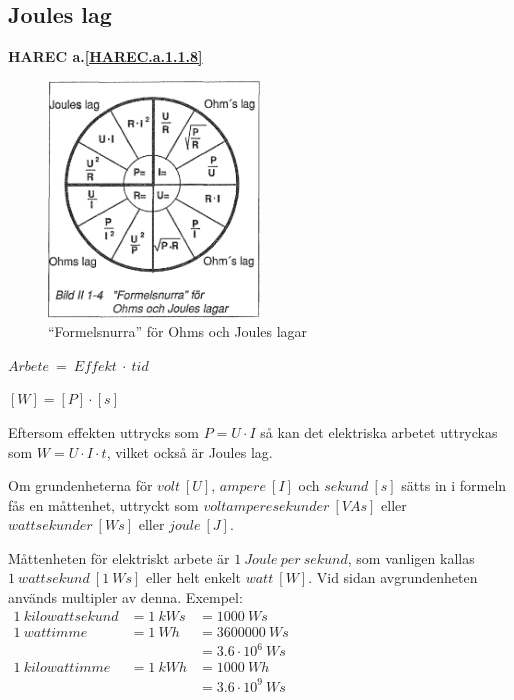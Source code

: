 \subsection{Joules lag}
\textbf{HAREC a.\ref{HAREC.a.1.1.8}\label{myHAREC.a.1.1.8}}

\begin{figure}
  \includegraphics[width=0.5\textwidth]{images/bild_2_1-04}
  \caption{``Formelsnurra'' för Ohms och Joules lagar}
  \label{fig:BildII1-4}
\end{figure}

\(Arbete\ =\ Effekt\ \cdot\ tid\)

\([W] = [P] \cdot [s]\)

Eftersom effekten uttrycks som \(P = U \cdot I\) så kan det elektriska arbetet
uttryckas som \(W = U \cdot I \cdot t\), vilket också är Joules lag.

Om grundenheterna för \(volt\ [U]\), \(ampere\ [I]\) och \(sekund\ [s]\) sätts in i
formeln fås en måttenhet, uttryckt som \(voltamperesekunder\ [VAs]\) eller
\(wattsekunder\ [Ws]\) eller \(joule\ [J]\).

Måttenheten för elektriskt arbete är \(1\ Joule\ per\ sekund\), som vanligen kallas
\(1\ wattsekund\ [1\ Ws]\) eller helt enkelt \(watt\ [W]\).
Vid sidan avgrundenheten används multipler
av denna.
Exempel:
\(
\begin{array}{lll}
1\ kilowattsekund & = 1\ kWs & = 1 000\ Ws \\
1\ wattimme & = 1\ Wh & = 3600000\ Ws \\
 & & = 3.6 · 10^6\ Ws \\
1\ kilowattimme & = 1\ kWh & = 1 000\ Wh \\
 & & = 3.6 · 10^9\ Ws
\end{array}
\)

